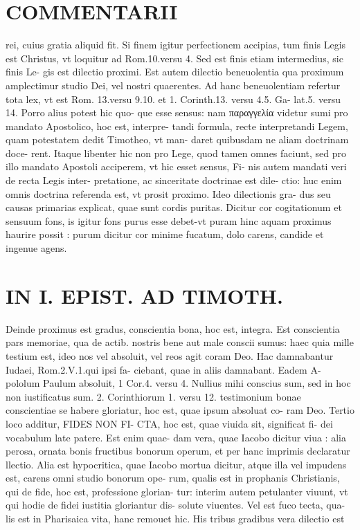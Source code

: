 \documentclass{article}
\begin{document}
\begin{pages}
\section*{COMMENTARII }
\marginpar{[ p.22 ]}\pstart rei, cuius gratia aliquid fit. Si finem igitur perfectionem accipias, tum finis Legis est Christus, vt loquitur ad Rom.10.versu 4. Sed est finis etiam intermedius, sic finis Le- gis est dilectio proximi. Est autem dilectio beneuolentia qua proximum amplectimur studio Dei, vel nostri quaerentes. Ad hanc beneuolentiam refertur tota lex, vt est Rom. 13.versu 9.10. et 1. Corinth.13. versu 4.5. Ga- lat.5. versu 14. Porro alius potest hic quo- que esse sensus: nam παραγγελία videtur sumi pro mandato Apostolico, hoc est, interpre- tandi formula, recte interpretandi Legem, quam potestatem dedit Timotheo, vt man- daret quibusdam ne aliam doctrinam doce- rent. Itaque libenter hic non pro Lege, quod tamen omnes faciunt, sed pro illo mandato Apostoli acciperem, vt hic esset sensus, Fi- nis autem mandati veri de recta Legis inter- pretatione, ac sinceritate doctrinae est dile- ctio: huc enim omnis doctrina referenda est, vt prosit proximo. Ideo dilectionis gra- dus seu causas primarias explicat, quae sunt cordis puritas. Dicitur cor cogitationum et sensuum fons, is igitur fons purus esse debet-vt puram hinc aquam proximus haurire possit : purum dicitur cor minime fucatum, dolo carens, candide et ingenue agens.  \pend
\section*{IN I. EPIST. AD TIMOTH. }
\marginpar{[ p.23 ]}\pstart Deinde proximus est gradus, conscientia bona, hoc est, integra. Est conscientia pars memoriae, qua de actib. nostris bene aut male conscii sumus: haec quia mille testium est, ideo nos vel absoluit, vel reos agit coram Deo. Hac damnabantur Iudaei, Rom.2.V.1.qui ipsi fa- ciebant, quae in aliis damnabant. Eadem A- pololum Paulum absoluit, 1 Cor.4. versu 4. Nullius mihi conscius sum, sed in hoc non iustificatus sum. 2. Corinthiorum 1. versu 12. testimonium bonae conscientiae se habere gloriatur, hoc est, quae ipsum absoluat co- ram Deo.  \pend\pstart Tertio loco additur, FIDES NON FI- CTA, hoc est, quae viuida sit, significat fi- dei vocabulum late patere. Est enim quae- dam vera, quae Iacobo dicitur viua : alia perosa, ornata bonis fructibus bonorum operum, et per hanc imprimis declaratur llectio. Alia est hypocritica, quae Iacobo mortua dicitur, atque illa vel impudens est, carens omni studio bonorum ope- rum, qualis est in prophanis Christianis, qui de fide, hoc est, professione glorian- tur: interim autem petulanter viuunt, vt qui hodie de fidei iustitia gloriantur dis- solute viuentes. Vel est fuco tecta, qua- lis est in Pharisaica vita, hanc remouet hic. His tribus gradibus vera dilectio est  \pend

\end{pages}
\end{document}
